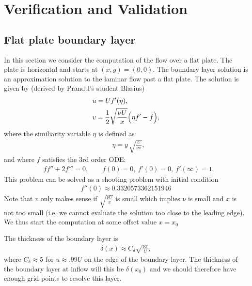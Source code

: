 \section{Verification and Validation} \label{sec:verificationAndValidation}



\subsection{Flat plate boundary layer} \label{sec:flatPlateBoundaryLayer}


In this section we consider the computation of the flow over a flat plate.
The plate is horizontal and starts at $(x,y)=(0,0)$.
The boundary layer solution is an approximation solution to the laminar flow past a flat plate. The
solution  is given by (derived by Prandtl's student Blasius)
\begin{align*}
   & u = U f'(\eta), \\
   & v = {1\over2} \sqrt{\frac{\nu U}{x}} \Big( \eta f' - f \Big), 
\end{align*}
where the similiarity variable $\eta$ is defined as
\begin{align*}
   & \eta = y\, \sqrt{\frac{U}{\nu x}},
\end{align*}
and where $f$ satisfies the 3rd order ODE:
\begin{align*}
   & f f'' + 2 f ''' = 0, \qquad f(0)=0, ~ f'(0)=0, ~ f'(\infty)=1.
\end{align*}
This problem can be solved as a shooting problem with initial condition
\begin{align*}
   f''(0) \approx 0.3320573362151946
\end{align*}
Note that $v$ only makes sense if $\sqrt{\frac{\nu U}{x}}$ is small which implies $\nu$ is small
and $x$ is not too small (i.e. we cannot evaluate the solution too close to the leading edge). 
We thus start the computation at some offset value $x=x_0$

The thickness of the boundary layer is
\begin{align*}
   \delta(x) \approx C_\delta \sqrt{\frac{\nu x}{U}} , 
\end{align*}
where $C_\delta\approx 5$ for $u\approx .99 U$ on the edge of the boundary layer. 
The thickness of the boundary layer at inflow will this be $\delta(x_0)$ and we should therefore have
enough grid points to resolve this layer. 


